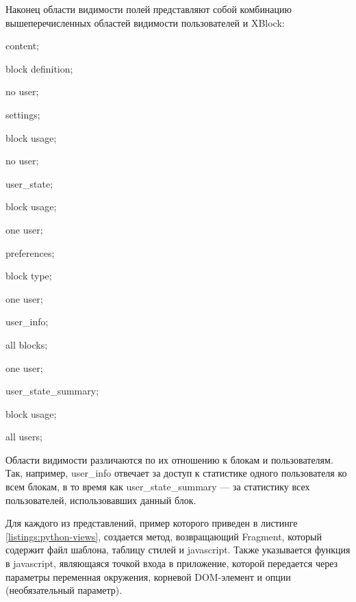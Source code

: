 Наконец области видимости полей представляют собой комбинацию вышеперечисленных областей видимости пользователей и XBlock:
\begin{itemize*}
	\item content;
	\begin{itemize*}
		\item block definition;
		\item no user;
	\end{itemize*}
	\item settings;
	\begin{itemize*}
		\item block usage;
		\item no user;
	\end{itemize*}
	\item user\_state;
	\begin{itemize*}
		\item block usage;
		\item one user;
	\end{itemize*}
	\item preferences;
	\begin{itemize*}
		\item block type;
		\item one user;
	\end{itemize*}
	\item user\_info;
	\begin{itemize*}
		\item all blocks;
		\item one user;
	\end{itemize*}
	\item user\_state\_summary;	
	\begin{itemize*}
		\item block usage;
		\item all users;
	\end{itemize*}
\end{itemize*}

Области видимости различаются по их отношению к блокам и пользователям. Так, например, user\_info отвечает за доступ к статистике одного пользователя ко всем блокам, в
то время как user\_state\_summary — за статистику всех пользователей, использовавших
данный блок.

Для каждого из представлений, пример которого приведен в листинге \ref{listings:python-views}, создается метод, возвращающий Fragment, который содержит файл шаблона, таблицу стилей и javascript. Также указывается функция в javascript, являющаяся точкой входа в приложение, которой передается через параметры переменная окружения, корневой DOM-элемент и опции (необязательный параметр).

